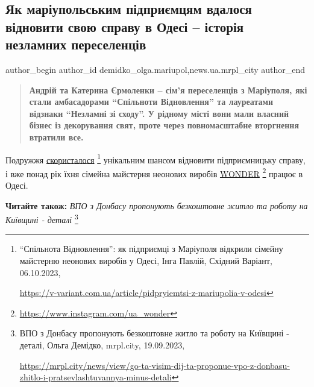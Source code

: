  
 
 
 
 
 
\subsection{Як маріупольським підприємцям вдалося відновити свою справу в Одесі – історія незламних переселенців}
\label{sec:16_10_2023.stz.news.ua.mrpl_city.1.mrpl_pereselenci_vidnov_sprava_odesa}
 
\ifcmt
 author_begin
   author_id demidko_olga.mariupol,news.ua.mrpl_city
 author_end
\fi

\begin{quote}
\bfseries
Андрій та Катерина Єрмоленки – сім'я переселенців з Маріуполя, які стали
амбасадорами \enquote{Спільноти Відновлення} та лауреатами відзнаки \enquote{Незламні зі
сходу}. У рідному місті вони мали власний бізнес із декорування свят, проте
через повномасштабне вторгнення втратили все.
\end{quote}

Подружжя \href{https://v-variant.com.ua/article/pidpryiemtsi-z-mariupolia-v-odesi}{скористалося}%
\footnote{\enquote{Спільнота Відновлення}: як підприємці з Маріуполя відкрили сімейну майстерню неонових виробів у Одесі, %
Інга Павлій, Східний Варіант, 06.10.2023, \par%
\url{https://v-variant.com.ua/article/pidpryiemtsi-z-mariupolia-v-odesi}
}
унікальним шансом відновити підприємницьку справу, і вже
понад рік їхня сімейна майстерня неонових виробів \href{https://www.instagram.com/ua_wonder}{WONDER}%
\footnote{\url{https://www.instagram.com/ua_wonder}}
працює в Одесі.

\textbf{Читайте також:} \emph{ВПО з Донбасу пропонують безкоштовне житло та роботу на Київщині - деталі}%
\footnote{ВПО з Донбасу пропонують безкоштовне житло та роботу на Київщині - деталі, Ольга Демідко, mrpl.city, 19.09.2023, \par%
\url{https://mrpl.city/news/view/go-ta-visim-dij-ta-proponue-vpo-z-donbasu-zhitlo-i-pratsevlashtuvannya-minus-detali}%
}

